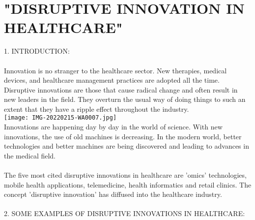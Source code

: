 \documentclass{article}
\begin{document}
\section{"DISRUPTIVE  INNOVATION  IN  HEALTHCARE"}
1. INTRODUCTION: \\
\\
Innovation is no stranger to the healthcare sector. New therapies, medical devices, and healthcare management practices are adopted all the time. Disruptive innovations are those that cause radical change and often result in new leaders in the field. They overturn the usual way of doing things to such an extent that they have a ripple effect throughout the industry.\\

\texttt{[image: IMG-20220215-WA0007.jpg]} 
\\
Innovations are happening day by day in the world of science.  With new innovations, the use of old machines is decreasing. In the modern world, better technologies and better machines are being discovered and leading to advances in the medical field.\\
\\
The five most cited disruptive innovations in healthcare are 'omics' technologies, mobile health applications, telemedicine, health informatics and retail clinics. The concept 'disruptive innovation' has diffused into the healthcare industry. \\
\\
2. SOME EXAMPLES OF DISRUPTIVE INNOVATIONS IN HEALTHCARE:\\
\end{document}

